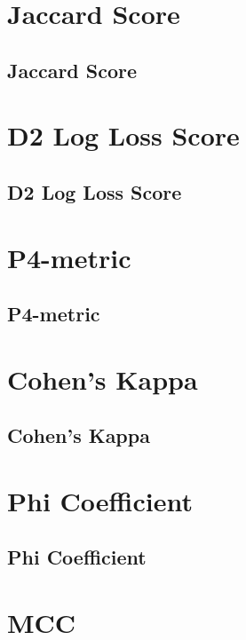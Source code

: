 \clearpage
\thispagestyle{classificationstyle}
\section{Jaccard Score}
\subsection{Jaccard Score}

\clearpage
\thispagestyle{classificationstyle}
\section{D2 Log Loss Score}
\subsection{D2 Log Loss Score}

\clearpage
\thispagestyle{classificationstyle}
\section{P4-metric}
\subsection{P4-metric}

\clearpage
\thispagestyle{classificationstyle}
\section{Cohen's Kappa}
\subsection{Cohen's Kappa}

\clearpage
\thispagestyle{classificationstyle}
\section{Phi Coefficient}
\subsection{Phi Coefficient}

\clearpage
\thispagestyle{classificationstyle}
\section{MCC}
